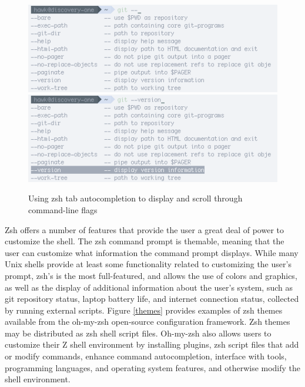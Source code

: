 \documentclass[12pt,a4paper]{article}
\begin{document}
		\begin{figure}[ht!]
			\includegraphics[resolution=72, scale=0.75]{Lab1Images/gittab.png}
			\includegraphics[resolution=72, scale=0.75]{Lab1Images/gitscroll.png}
			\caption{Using zsh tab autocompletion to display and scroll through command-line flags}
			\label{arguments}
		\end{figure}

		Zsh offers a number of features that provide the user a great deal of power to customize the shell. The zsh command prompt is themable, meaning that the user can customize what information the command prompt displays. While many Unix shells provide at least some functionality related to customizing the user's prompt, zsh's is the most full-featured, and allows the use of colors and graphics, as well as the display of additional information about the user's system, such as git repository status, laptop battery life, and internet connection status, collected by running external scripts. Figure \ref{themes} provides examples of zsh themes available from the oh-my-zsh open-source configuration framework. Zsh themes may be distributed as zsh shell script files. Oh-my-zsh also allows users to customize their Z shell environment by installing plugins, zsh script files that add or modify commands, enhance command autocompletion, interface with tools, programming languages, and operating system features, and otherwise modify the shell environment.
\end{document}
